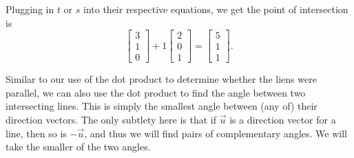 \documentclass{ximera}
\begin{document}
\begin{example}
 Plugging in $t$ or $s$ into their respective equations, we get the point of intersection is
  \begin{equation*}
    \begin{bmatrix} 3 \\ 1 \\ 0 \end{bmatrix}
    + 1 \begin{bmatrix} 2 \\ 0 \\ 1 \end{bmatrix}
    = \begin{bmatrix} 5 \\ 1 \\ 1 \end{bmatrix}.
  \end{equation*}
\end{example}


Similar to our use of the dot product to determine whether the liens were parallel, we can also use the dot product to find the angle between two intersecting
lines. This is simply the smallest angle between (any of) their
direction vectors. The only subtlety here is that if $\vec{u}$ is a
direction vector for a line, then so is $-\vec{u}$, and thus we will
find pairs of complementary angles. We will take the smaller of the
two angles.

\begin{center} 
\end{center}
\end{document}
